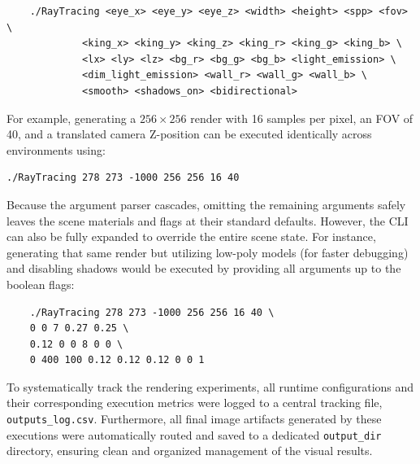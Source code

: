 \documentclass[11pt, a4paper]{article}
\begin{document}
\begin{verbatim}
    ./RayTracing <eye_x> <eye_y> <eye_z> <width> <height> <spp> <fov> \
             <king_x> <king_y> <king_z> <king_r> <king_g> <king_b> \
             <lx> <ly> <lz> <bg_r> <bg_g> <bg_b> <light_emission> \
             <dim_light_emission> <wall_r> <wall_g> <wall_b> \
             <smooth> <shadows_on> <bidirectional>
\end{verbatim}

For example, generating a $256 \times 256$ render with 16 samples per pixel, an FOV of 40, and a translated camera Z-position can be executed identically across environments using:
\begin{verbatim}
./RayTracing 278 273 -1000 256 256 16 40
\end{verbatim}

Because the argument parser cascades, omitting the remaining arguments safely leaves the scene materials and flags at their standard defaults. However, the CLI can also be fully expanded to override the entire scene state. For instance, generating that same render but utilizing low-poly models (for faster debugging) and disabling shadows would be executed by providing all arguments up to the boolean flags:
\begin{verbatim}
    ./RayTracing 278 273 -1000 256 256 16 40 \ 
    0 0 7 0.27 0.25 \
    0.12 0 0 8 0 0 \
    0 400 100 0.12 0.12 0.12 0 0 1
\end{verbatim}

To systematically track the rendering experiments, all runtime configurations and their corresponding execution metrics were logged to a central tracking file, \texttt{outputs\_log.csv}. Furthermore, all final image artifacts generated by these executions were automatically routed and saved to a dedicated \texttt{output\_dir} directory, ensuring clean and organized management of the visual results.
\end{document}
